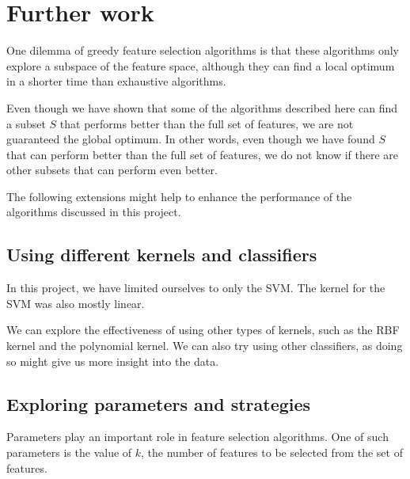 \documentclass[12pt, twoside, a4paper]{report}
\begin{document}
\section{Further work} \label{further_work}


One dilemma of greedy feature selection algorithms is that these algorithms only explore a subspace of the feature space, although they can find a local optimum in a shorter time than exhaustive algorithms.


Even though we have shown that some of the algorithms described here can find a subset $S$ that performs better than the full set of features, we are not guaranteed the global optimum. In other words, even though we have found $S$ that can perform better than the full set of features, we do not know if there are other subsets that can perform even better.

The following extensions might help to enhance the performance of the algorithms discussed in this project.


\subsection{Using different kernels and classifiers}

In this project, we have limited ourselves to only the SVM. The kernel for the SVM was also mostly linear.

We can explore the effectiveness of using other types of kernels, such as the RBF kernel and the polynomial kernel. We can also try using other classifiers, as doing so might give us more insight into the data. 

\subsection{Exploring parameters and strategies}

Parameters play an important role in feature selection algorithms. One of such parameters is the value of $k$, the number of features to be selected from the set of features.
\end{document}
